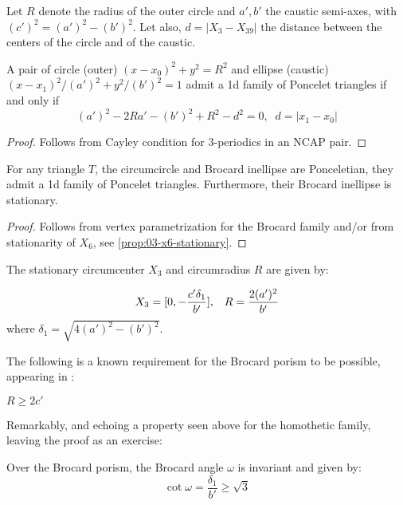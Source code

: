 Let $R$ denote the radius of the outer circle and $a',b'$ the caustic semi-axes, with $(c')^2=(a')^2-(b')^2$. Let also, $d=|X_{3}-X_{39}|$ the distance between the centers of the circle and of the caustic.

\begin{proposition}
A pair of circle (outer) $(x-x_0)^2+y^2=R^2$ and ellipse (caustic) $(x-x_1)^2/(a')^2+y^2/(b')^2=1$ admit a 1d family of Poncelet triangles if and only if 
\[(a')^2  - 2 R a'- (b')^2 +  R^2-d^2=0,\;\; d=|x_1-x_0| \]
\end{proposition}
\begin{proof}
  Follows from Cayley condition for 3-periodics in an NCAP pair.
\end{proof}
\begin{proposition}
For any triangle $T$, the circumcircle and Brocard inellipse are Ponceletian, they admit a 1d family of Poncelet triangles. Furthermore, their Brocard inellipse is stationary.
\label{prop:04-broc-inellipse-stationary}
\end{proposition}

\begin{proof}
Follows from vertex parametrization for the Brocard family and/or from stationarity of $X_6$, see \cref{prop:03-x6-stationary}. 
\end{proof}

\begin{proposition}
The stationary circumcenter $X_3$ and circumradius $R$ are given by:

\begin{equation}
X_3=[0,-\frac{c'\delta_1}{b'}],\;\;\;R= \frac{2 (a')^2}{b'} \\
 \label{eqn:broc-circumcircle}
\end{equation}
where $\delta_1=\sqrt{4 (a')^2-(b')^2}$.
\label{prop:cotw}
\end{proposition}

The following is a known requirement for the Brocard porism to be possible, appearing in \cite[Eqs. 15--17]{shail1996-brocard}:

\begin{corollary}
$R{\geq}2 c'$
\label{rem:minR}
\end{corollary}

Remarkably, and echoing a property seen above for the homothetic family, leaving the proof as an exercise:

\begin{proposition}
Over the Brocard porism, the Brocard angle $\omega$ is invariant and given by:
\[\cot\omega=\frac{\delta_1}{b'} \geq \sqrt{3} \]
\label{prop:04-brocard-w}
\end{proposition}

